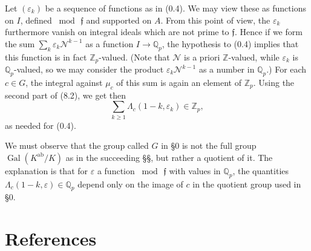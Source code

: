 \documentclass[12pt,a4paper]{article}
\theoremstyle{plain}
\theoremstyle{definition}
\theoremstyle{remark}
\DeclareMathOperator{\Gal}{Gal}
\begin{document}
Let $(\varepsilon_k)$ be a sequence of functions as in (0.4). We may view these as functions on $I$, defined $\bmod\, \mathfrak{f}$ and supported on $A$. From this point of view, the $\varepsilon_k$ furthermore vanish on integral ideals which are not prime to $\mathfrak{f}$. Hence if we form the sum $\sum_k \varepsilon_k \mathcal{N}^{k-1}$ as a function $I \to \mathbb{Q}_p$, the hypothesis to (0.4) implies that this function is in fact $\mathbb{Z}_p$-valued. (Note that $\mathcal{N}$ is a priori $\mathbb{Z}$-valued, while $\varepsilon_k$ is $\mathbb{Q}_p$-valued, so we may consider the product $\varepsilon_k \mathcal{N}^{k-1}$ as a number in $\mathbb{Q}_p$.) For each $c \in G$, the integral against $\mu_c$ of this sum is again an element of $\mathbb{Z}_p$. Using the second part of (8.2), we get then
\[
\sum_{k \ge 1} \varLambda_c(1-k, \varepsilon_k) \in \mathbb{Z}_p,
\]
as needed for (0.4).

We must observe that the group called $G$ in \S0 is not the full group $\Gal(K^{\mathrm{ab}}/K)$ as in the succeeding \S\S, but rather a quotient of it. The explanation is that for $\varepsilon$ a function $\bmod\, \mathfrak{f}$ with values in $\mathbb{Q}_p$, the quantities $\varLambda_c(1-k, \varepsilon) \in \mathbb{Q}_p$ depend only on the image of $c$ in the quotient group used in \S0.


\section*{References}
\end{document}
